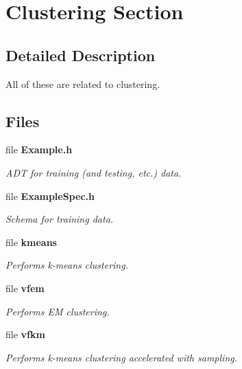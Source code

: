 \section{Clustering Section}
\label{group__Clustering}


\subsection{Detailed Description}
All of these are related to clustering. 

\subsection*{Files}
\begin{CompactItemize}
\item 
file {\bf Example.h}
\begin{CompactList}\small\item\em ADT for training (and testing, etc.) data. \item\end{CompactList}

\item 
file {\bf Example\-Spec.h}
\begin{CompactList}\small\item\em Schema for training data. \item\end{CompactList}

\item 
file {\bf kmeans}
\begin{CompactList}\small\item\em Performs k-means clustering. \item\end{CompactList}

\item 
file {\bf vfem}
\begin{CompactList}\small\item\em Performs EM clustering. \item\end{CompactList}

\item 
file {\bf vfkm}
\begin{CompactList}\small\item\em Performs k-means clustering accelerated with sampling. \item\end{CompactList}

\end{CompactItemize}
